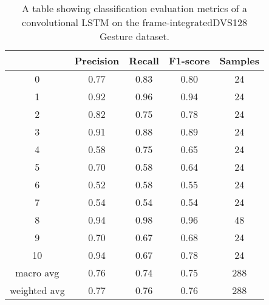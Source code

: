 \begin{table}[htb]
    \centering
    \begin{tabular}{|| c | c | c | c | c ||}
        \hline
             & Precision & Recall & F1-score & Samples \\
        \hline
        \hline
        0            & 0.77 & 0.83 & 0.80 & 24  \\
        \hline
        1            & 0.92 & 0.96 & 0.94 & 24  \\
        \hline
        2            & 0.82 & 0.75 & 0.78 & 24  \\
        \hline
        3            & 0.91 & 0.88 & 0.89 & 24  \\
        \hline
        4            & 0.58 & 0.75 & 0.65 & 24  \\
        \hline
        5            & 0.70 & 0.58 & 0.64 & 24  \\
        \hline
        6            & 0.52 & 0.58 & 0.55 & 24  \\
        \hline
        7            & 0.54 & 0.54 & 0.54 & 24  \\
        \hline
        8            & 0.94 & 0.98 & 0.96 & 48  \\
        \hline
        9            & 0.70 & 0.67 & 0.68 & 24  \\
        \hline
        10           & 0.94 & 0.67 & 0.78 & 24  \\
        \hline
        macro avg    & 0.76 & 0.74 & 0.75 & 288 \\
        \hline
        weighted avg & 0.77 & 0.76 & 0.76 & 288 \\
        \hline
    \end{tabular}
    \caption{A table showing classification evaluation metrics of a convolutional LSTM on the frame-integratedDVS128 Gesture dataset.}
    \label{tab:custom_conv_lstm_dvs128_evaluation_metrics}
\end{table}

